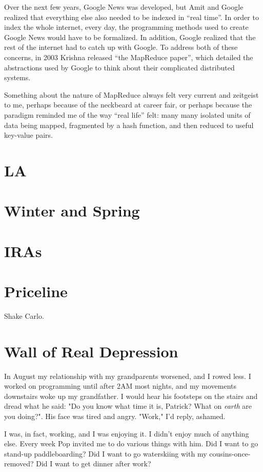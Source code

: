 \documentclass[12pt]{article}
\begin{document}
Over the next few years, Google News was developed, but Amit and Google realized
that everything else also needed to be indexed in ``real time''.  In order to
index the whole internet, every day, the programming methods used to create
Google News would have to be formalized.  In addition, Google realized that the
rest of the internet had to catch up with Google.  To address both of these
concerns, in 2003 Krishna released ``the MapReduce paper'', which detailed the
abstractions used by Google to think about their complicated distributed
systems.  

Something about the nature of MapReduce always felt very current and zeitgeist
to me, perhaps because of the neckbeard at career fair, or perhaps because the
paradigm reminded me of the way ``real life'' felt: many many isolated units of
data being mapped, fragmented by a hash function, and then reduced to useful
key-value pairs.


\section{LA}


\section{Winter and Spring}


\section{IRAs}


\section{Priceline}
Shake Carlo.  


\section{Wall of Real Depression}
In August my relationship with my grandparents worsened, and I rowed less.  I
worked on programming until after 2AM most nights, and my movements downstairs
woke up my grandfather.  I would hear his footsteps on the stairs and dread what
he said: "Do you know what time it is, Patrick?  What on \textit{earth} are you
doing?".  His face was tired and angry. "Work," I'd reply, ashamed.

I was, in fact, working, and I was enjoying it.  I didn't enjoy much of anything
else.  Every week Pop invited me to do various things with him.  Did I want to
go stand-up paddleboarding?  Did I want to go waterskiing with my cousins-once-
removed?  Did I want to get dinner after work?  
\end{document}
